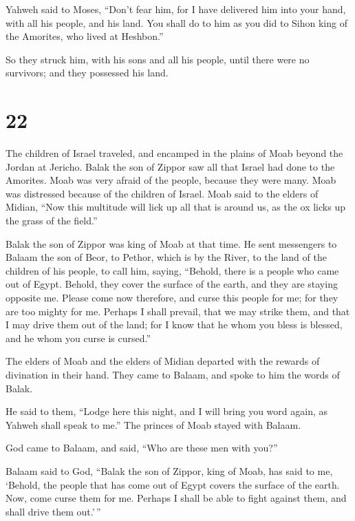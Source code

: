  Yahweh said to Moses, ``Don't fear him, for I have
delivered him into your hand, with all his people, and his land. You
shall do to him as you did to Sihon king of the Amorites, who lived at
Heshbon.''

 So they struck him, with his sons and all his people,
until there were no survivors; and they possessed his land.

\hypertarget{section-21}{%
\section{22}\label{section-21}}

 The children of Israel traveled, and encamped in the plains
of Moab beyond the Jordan at Jericho.  Balak the son of
Zippor saw all that Israel had done to the Amorites.  Moab
was very afraid of the people, because they were many. Moab was
distressed because of the children of Israel.  Moab said to
the elders of Midian, ``Now this multitude will lick up all that is
around us, as the ox licks up the grass of the field.''

Balak the son of Zippor was king of Moab at that time.  He
sent messengers to Balaam the son of Beor, to Pethor, which is by the
River, to the land of the children of his people, to call him, saying,
``Behold, there is a people who came out of Egypt. Behold, they cover
the surface of the earth, and they are staying opposite me. 
Please come now therefore, and curse this people for me; for they are
too mighty for me. Perhaps I shall prevail, that we may strike them, and
that I may drive them out of the land; for I know that he whom you bless
is blessed, and he whom you curse is cursed.''

 The elders of Moab and the elders of Midian departed with
the rewards of divination in their hand. They came to Balaam, and spoke
to him the words of Balak.

 He said to them, ``Lodge here this night, and I will bring
you word again, as Yahweh shall speak to me.'' The princes of Moab
stayed with Balaam.

 God came to Balaam, and said, ``Who are these men with
you?''

 Balaam said to God, ``Balak the son of Zippor, king of
Moab, has said to me,  `Behold, the people that has come
out of Egypt covers the surface of the earth. Now, come curse them for
me. Perhaps I shall be able to fight against them, and shall drive them
out.'\,''

